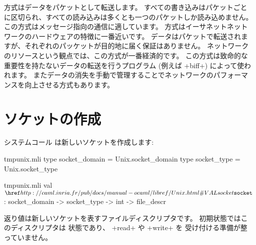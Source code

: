  方式はデータをパケットとして転送します。
すべての書き込みはパケットごとに区切られ、すべての読み込みは多くとも一つのパケットしか読み込めません。
この方式はメッセージ指向の通信に適しています。
 方式はイーサネットネットワークのハードウェアの特徴に一番近いです。
データはパケットで転送されますが、それぞれのパッケットが目的地に届く保証はありません。
ネットワークのリソースという観点では、この方式が一番経済的です。
この方式は致命的な重要性を持たないデータの転送を行うプログラム (例えば \ml+biff+) によって使われます。
またデータの消失を手動で管理することでネットワークのパフォーマンスを向上させる方式もあります。
%
\section{ソケットの作成}

システムコール  は新しいソケットを作成します:
%
\begin{codefile}{tmpunix.mli}
type socket_domain = Unix.socket_domain
type socket_type = Unix.socket_type
\end{codefile}
%
\begin{listingcodefile}{tmpunix.mli}
val $\libvalue{Unix}{socket}$ : socket_domain -> socket_type -> int -> file_descr
\end{listingcodefile}
%
返り値は新しいソケットを表すファイルディスクリプタです。
初期状態ではこのディスクリプタは  状態であり、 \ml+read+ や \ml+write+ を
受け付ける準備が整っていません。

